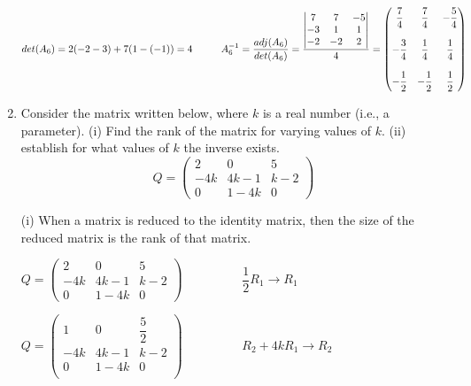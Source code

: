\documentclass[fleqn]{article}
\begin{document}
\begin{enumerate}
      \textcolor{hwColor}{
        $
        det(A_6)=2(-2-3)+7(1-(-1))=4
        \hskip 1truecm
        A_6^{-1}=\dfrac{adj(A_6)}{det(A_6)}=\dfrac{
          \begin{vmatrix}
           7 & 7 & -5 \\
           -3 & 1 & 1 \\
           -2 & -2 & 2 \\
          \end{vmatrix}
        }{4}=\begin{pmatrix}
         \dfrac{7}{4} & \dfrac{7}{4} & -\dfrac{5}{4} \\
         \\
         -\dfrac{3}{4} & \dfrac{1}{4} & \dfrac{1}{4} \\
         \\
         -\dfrac{1}{2} & -\dfrac{1}{2} & \dfrac{1}{2} \\
        \end{pmatrix}
        $
      }

    \bigbreak
    
    \item  Consider the matrix written below, where $k$ is a real number (i.e., a parameter). (i) Find the rank of the matrix for varying values of $k$. (ii) establish for what values of $k$ the inverse exists. 
      $$
      Q = 
      \begin{pmatrix}
      2 & 0 & 5 \\
      -4k & 4k-1 & k-2 \\
      0 & 1-4k & 0
      \end{pmatrix}
      $$

      \textcolor{hwColor}{
        (i) When a matrix is reduced to the identity matrix, then the size of the reduced matrix is the rank of that matrix.
      }

      \textcolor{hwColor}{
        $
        Q = 
          \begin{pmatrix}
          2 & 0 & 5 \\
          -4k & 4k-1 & k-2 \\
          0 & 1-4k & 0
          \end{pmatrix}
          \hspace{2cm} \dfrac{1}{2}R_1 \longrightarrow R_1 \hspace{2cm}
        $
      }

      \textcolor{hwColor}{
        $
          Q=\begin{pmatrix}
            1 & 0 & \dfrac{5}{2} \\
            -4k & 4k-1 & k-2 \\
            0 & 1-4k & 0 \\
          \end{pmatrix}
          \hspace{2cm} R_2+4kR_1 \longrightarrow R_2 \hspace{1cm}
        $
      }


\end{enumerate}
\end{document}
